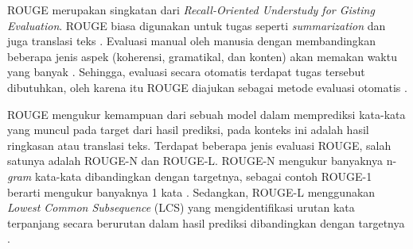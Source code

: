 ROUGE merupakan singkatan dari \textit{Recall-Oriented Understudy for Gisting Evaluation}. ROUGE biasa digunakan untuk tugas seperti \textit{summarization} dan juga translasi teks \parencite{rouge}. Evaluasi manual oleh manusia dengan membandingkan beberapa jenis aspek (koherensi, gramatikal, dan konten) akan memakan waktu yang banyak \parencite{rouge}. Sehingga, evaluasi secara otomatis terdapat tugas tersebut dibutuhkan, oleh karena itu ROUGE diajukan sebagai metode evaluasi otomatis \parencite{rouge}.

ROUGE mengukur kemampuan dari sebuah model dalam memprediksi kata-kata yang muncul pada target dari hasil prediksi, pada konteks ini adalah hasil ringkasan atau translasi teks. Terdapat beberapa jenis evaluasi ROUGE, salah satunya adalah ROUGE-N dan ROUGE-L. ROUGE-N mengukur banyaknya n-\textit{gram} kata-kata dibandingkan dengan targetnya, sebagai contoh ROUGE-1 berarti mengukur banyaknya 1 kata \parencite{rouge}. Sedangkan, ROUGE-L menggunakan \textit{Lowest Common Subsequence} (LCS) yang mengidentifikasi urutan kata terpanjang secara berurutan dalam hasil prediksi dibandingkan dengan targetnya \parencite{rouge}.
